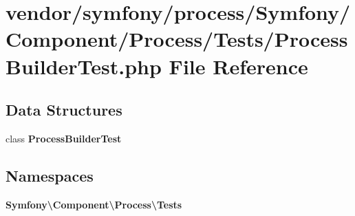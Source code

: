 \section{vendor/symfony/process/\+Symfony/\+Component/\+Process/\+Tests/\+Process\+Builder\+Test.php File Reference}
\label{_process_builder_test_8php}
\subsection*{Data Structures}
\begin{DoxyCompactItemize}
\item 
class {\bf Process\+Builder\+Test}
\end{DoxyCompactItemize}
\subsection*{Namespaces}
\begin{DoxyCompactItemize}
\item 
 {\bf Symfony\textbackslash{}\+Component\textbackslash{}\+Process\textbackslash{}\+Tests}
\end{DoxyCompactItemize}
